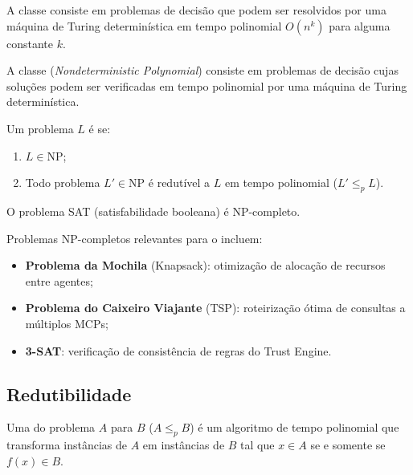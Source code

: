 \begin{definicao}[Classe P]
    A classe  consiste em problemas de decisão que podem ser
    resolvidos por uma máquina de Turing determinística em tempo polinomial
    $O(n^k)$ para alguma constante $k$.
\end{definicao}

\begin{definicao}[Classe NP]
    A classe  (\textit{Nondeterministic Polynomial}) consiste
    em problemas de decisão cujas soluções podem ser verificadas em tempo
    polinomial por uma máquina de Turing determinística.
\end{definicao}

\begin{definicao}[NP-completude]
    Um problema $L$ é  se:
    \begin{enumerate}
        \item $L \in \text{NP}$;
        \item Todo problema $L' \in \text{NP}$ é redutível a $L$ em tempo
              polinomial ($L' \leq_p L$).
    \end{enumerate}
\end{definicao}

\begin{teorema}
    O problema SAT (satisfabilidade booleana) é NP-completo.
\end{teorema}

\begin{exemplo}
    Problemas NP-completos relevantes para o \opencodeeco{} incluem:
    \begin{itemize}
        \item \textbf{Problema da Mochila} (Knapsack): otimização de alocação
              de recursos entre agentes;
        \item \textbf{Problema do Caixeiro Viajante} (TSP): roteirização
              ótima de consultas a múltiplos MCPs;
        \item \textbf{3-SAT}: verificação de consistência de regras do
              Trust Engine.
    \end{itemize}
\end{exemplo}

\subsection{Redutibilidade}

\begin{definicao}
    Uma  do problema $A$ para $B$
    ($A \leq_p B$) é um algoritmo de tempo polinomial que transforma
    instâncias de $A$ em instâncias de $B$ tal que $x \in A$ se e somente
    se $f(x) \in B$.
\end{definicao}

